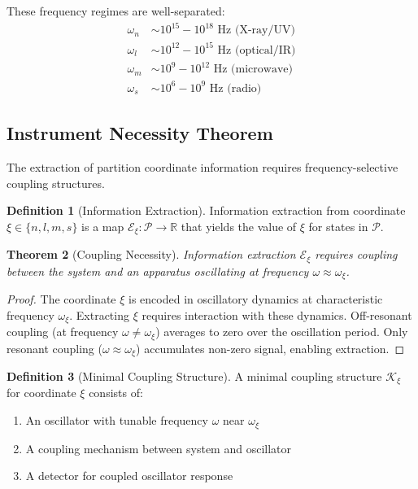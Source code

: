 \documentclass[twocolumn,10pt,a4paper]{article}
\newtheorem{theorem}{Theorem}[section]
\theoremstyle{definition}
\newtheorem{definition}[theorem]{Definition}
\theoremstyle{remark}
\newcommand{\partition}{\mathcal{P}}
\newcommand{\coupling}{\mathcal{K}}
\begin{document}
These frequency regimes are well-separated:
\begin{align}
\omega_n &\sim 10^{15} - 10^{18} \text{ Hz (X-ray/UV)} \\
\omega_l &\sim 10^{12} - 10^{15} \text{ Hz (optical/IR)} \\
\omega_m &\sim 10^{9} - 10^{12} \text{ Hz (microwave)} \\
\omega_s &\sim 10^{6} - 10^{9} \text{ Hz (radio)}
\end{align}

\subsection{Instrument Necessity Theorem}

The extraction of partition coordinate information requires frequency-selective coupling structures.

\begin{definition}[Information Extraction]
\label{def:extraction}
Information extraction from coordinate $\xi \in \{n, l, m, s\}$ is a map $\mathcal{E}_\xi: \partition \to \mathbb{R}$ that yields the value of $\xi$ for states in $\partition$.
\end{definition}

\begin{theorem}[Coupling Necessity]
\label{thm:coupling_necessity}
Information extraction $\mathcal{E}_\xi$ requires coupling between the system and an apparatus oscillating at frequency $\omega \approx \omega_\xi$.
\end{theorem}

\begin{proof}
The coordinate $\xi$ is encoded in oscillatory dynamics at characteristic frequency $\omega_\xi$. Extracting $\xi$ requires interaction with these dynamics. Off-resonant coupling (at frequency $\omega \neq \omega_\xi$) averages to zero over the oscillation period. Only resonant coupling ($\omega \approx \omega_\xi$) accumulates non-zero signal, enabling extraction.
\end{proof}

\begin{definition}[Minimal Coupling Structure]
\label{def:minimal_coupling}
A minimal coupling structure $\coupling_\xi$ for coordinate $\xi$ consists of:
\begin{enumerate}
\item An oscillator with tunable frequency $\omega$ near $\omega_\xi$
\item A coupling mechanism between system and oscillator
\item A detector for coupled oscillator response
\end{enumerate}
\end{definition}
\end{document}

